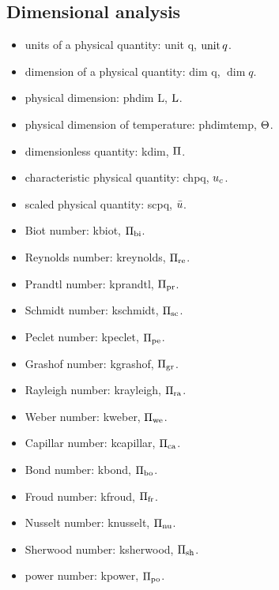 \subsection{Dimensional analysis}
\begin{itemize}
\item units of a physical quantity: unit q, $\operatorname{unit} q$.
\item dimension of a physical quantity: dim q, $\dim q$.
\item physical dimension: phdim L, $\text{L}$.
\item physical dimension of temperature: phdimtemp, $\Theta$.
\item dimensionless quantity: kdim, $\Pi$.
\item characteristic physical quantity: chpq, ${u}_{c}$.
\item scaled physical quantity: scpq, $\bar{u}$.
\item Biot number: kbiot, $\Pi_\text{bi}$.
\item Reynolds number: kreynolds, $\Pi_\text{re}$.
\item Prandtl number: kprandtl, $\Pi_\text{pr}$.
\item Schmidt number: kschmidt, $\Pi_\text{sc}$.
\item Peclet number: kpeclet, $\Pi_\text{pe}$.
\item Grashof number: kgrashof, $\Pi_\text{gr}$.
\item Rayleigh number: krayleigh, $\Pi_\text{ra}$.
\item Weber number: kweber, $\Pi_\text{we}$.
\item Capillar number: kcapillar, $\Pi_\text{ca}$.
\item Bond number: kbond, $\Pi_\text{bo}$.
\item Froud number: kfroud, $\Pi_\text{fr}$.
\item Nusselt number: knusselt, $\Pi_\text{nu}$.
\item Sherwood number: ksherwood, $\Pi_\text{sh}$.
\item power number: kpower, $\Pi_\text{po}$.
\end{itemize}
